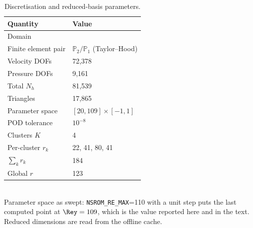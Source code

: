 \begin{table}[tb]
  \centering
  \caption{Discretisation and reduced-basis parameters.}
  \label{tab:params}
  \begin{tabular}{ll}
    \toprule
    Quantity & Value \\
    \midrule
    Domain & \CHECK{} \\
    Finite element pair & $\mathbb{P}_2/\mathbb{P}_1$ (Taylor--Hood) \\
    Velocity DOFs & 72{,}378 \\
    Pressure DOFs & 9{,}161 \\
    Total $N_h$ & 81{,}539 \\
    Triangles & 17{,}865 \\
    Parameter space & $[20,109]\times[-1,1]$ \\
    POD tolerance & $10^{-8}$ \\
    Clusters $K$ & 4 \\
    Per-cluster $r_k$ & 22, 41, 80, 41 \\
    $\sum_k r_k$ & 184 \\
    Global $r$ & 123 \\
    \bottomrule
  \end{tabular}
  \\[2pt] \footnotesize Parameter space as swept: \texttt{NSROM\_RE\_MAX}=110 with a unit step puts the last computed point at $\Rey=109$, which is the value reported here and in the text. Reduced dimensions are read from the offline cache.
\end{table}
